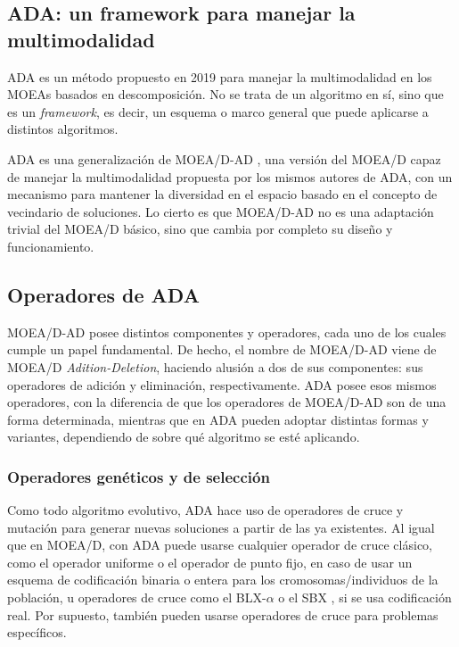 \subsection{ADA: un framework para manejar la multimodalidad}

ADA \cite{tanabe2019framework} es un método propuesto en 2019 para manejar la multimodalidad en los MOEAs basados en descomposición. No se trata de un algoritmo en sí, sino que es un \emph{framework}, es decir, un esquema o marco general que puede aplicarse a distintos algoritmos.

ADA es una generalización de MOEA/D-AD \cite{tanabe2018decomposition}, una versión del MOEA/D capaz de manejar la multimodalidad propuesta por los mismos autores de ADA, con un mecanismo para mantener la diversidad en el espacio basado en el concepto de vecindario de soluciones. Lo cierto es que MOEA/D-AD no es una adaptación trivial del MOEA/D básico, sino que cambia por completo su diseño y funcionamiento.



\subsection{Operadores de ADA}

MOEA/D-AD posee distintos componentes y operadores, cada uno de los cuales cumple un papel fundamental. De hecho, el nombre de MOEA/D-AD viene de MOEA/D \emph{Adition-Deletion}, haciendo alusión a dos de sus componentes: sus operadores de adición y eliminación, respectivamente. ADA posee esos mismos operadores, con la diferencia de que los operadores de MOEA/D-AD son de una forma determinada, mientras que en ADA pueden adoptar distintas formas y variantes, dependiendo de sobre qué algoritmo se esté aplicando.

\subsubsection{Operadores genéticos y de selección}

Como todo algoritmo evolutivo, ADA hace uso de operadores de cruce y mutación para generar nuevas soluciones a partir de las ya existentes. Al igual que en MOEA/D, con ADA puede usarse cualquier operador de cruce clásico, como el operador uniforme o el operador de punto fijo, en caso de usar un esquema de codificación binaria o entera para los cromosomas/individuos de la población, u operadores de cruce como el BLX-$\alpha$ \cite{eshelman1993real} o el SBX \cite{deb1995simulated}, si se usa codificación real. Por supuesto, también pueden usarse operadores de cruce para problemas específicos.

